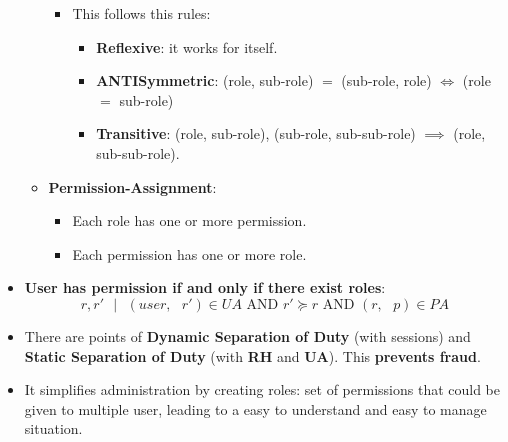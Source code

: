 \documentclass[9pt, letterpaper]{article}
\begin{document}
\begin{itemize}
\begin{itemize}
\begin{itemize}
			            \item This follows this rules:
			                  \begin{itemize}
				                  \item \textbf{Reflexive}: it works for itself.
				                  \item \textbf{ANTISymmetric}: (role, sub-role) $=$ (sub-role, role) $\iff$ (role $=$ sub-role)
				                  \item \textbf{Transitive}: (role, sub-role), (sub-role, sub-sub-role) $\implies$ (role, sub-sub-role).
			                  \end{itemize}
		            \end{itemize}
		      \item \textbf{Permission-Assignment}:
		            \begin{itemize}
			            \item Each role has one or more permission.
			            \item Each permission has one or more role.
		            \end{itemize}
	      \end{itemize}
	\item \textbf{User has permission if and only if there exist roles}: $$r,r' \mbox{ } | \mbox{ } (user,\mbox{ }r')\in UA  \mbox{ AND } r'\succeq r \mbox{ AND } (r,\mbox{ }p)\in PA$$
	\item There are points of \textbf{Dynamic Separation of Duty} (with sessions) and \textbf{Static Separation of Duty} (with \textbf{RH} and \textbf{UA}). This \textbf{prevents fraud}.
	\item It simplifies administration by creating roles: set of permissions that could be given to multiple user, leading to a easy to understand and easy to manage situation.
\end{itemize}
\end{document}
